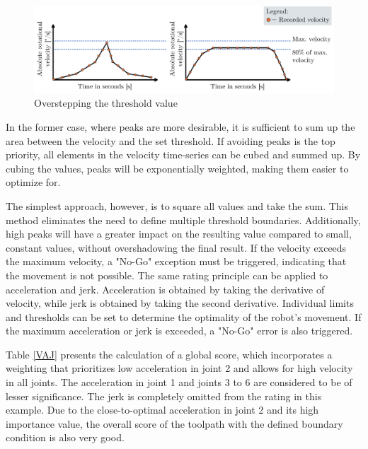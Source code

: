 \begin{figure}[H]
	\centerline{\includegraphics[width=1\textwidth]{figures/peaklong.png}}
	\caption{Overstepping the threshold value}
	\label{peaklong}
\end{figure}

In the former case, where peaks are more desirable, it is sufficient to sum up the area between the velocity and the set threshold. If avoiding peaks is the top priority, all elements in the velocity time-series can be cubed and summed up. By cubing the values, peaks will be exponentially weighted, making them easier to optimize for.


The simplest approach, however, is to square all values and take the sum. This method eliminates the need to define multiple threshold boundaries. Additionally, high peaks will have a greater impact on the resulting value compared to small, constant values, without overshadowing the final result. If the velocity exceeds the maximum velocity, a "No-Go" exception must be triggered, indicating that the movement is not possible. The same rating principle can be applied to acceleration and jerk. Acceleration is obtained by taking the derivative of velocity, while jerk is obtained by taking the second derivative. Individual limits and thresholds can be set to determine the optimality of the robot's movement. If the maximum acceleration or jerk is exceeded, a "No-Go" error is also triggered.

Table \ref{VAJ} presents the calculation of a global score, which incorporates a weighting that prioritizes low acceleration in joint 2 and allows for high velocity in all joints. The acceleration in joint 1 and joints 3 to 6 are considered to be of lesser significance. The jerk is completely omitted from the rating in this example. Due to the close-to-optimal acceleration in joint 2 and its high importance value, the overall score of the toolpath with the defined boundary condition is also very good.

